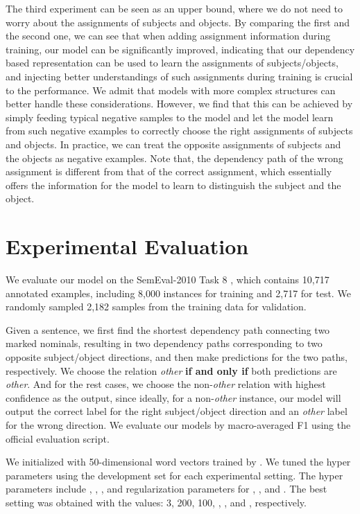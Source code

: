 \documentclass[11pt,a4paper]{article}
\begin{document}
The third experiment can be seen as an upper bound, where we do not need to worry about the assignments 
of subjects and objects. By comparing the first and the second one, we can see that when adding 
assignment information during training, our model can be significantly improved, indicating that our dependency based representation can be used to  learn the assignments of subjects/objects, and injecting
 better understandings of such assignments during training is crucial to the performance. 
We admit that models with more complex structures can better handle these considerations. 
However, we find that this can be achieved by simply feeding typical negative samples to the model 
and let the model learn from such negative examples to correctly choose the right assignments of subjects and objects. 
In practice, we can treat the opposite assignments of subjects and the objects as negative examples. 
Note that, the dependency path of the wrong assignment is different from that of the correct assignment, which essentially offers the information for the model to learn to distinguish the subject and the object. 







\section{Experimental Evaluation}
We evaluate our model on the SemEval-2010 Task 8 \cite{hendrickx}, which contains 10,717 annotated examples, including 8,000 instances for training and 2,717 for test. We randomly sampled 2,182 samples from the training data for validation.

Given a sentence, we first find the shortest dependency path connecting two marked nominals, resulting in two dependency paths corresponding to two opposite subject/object directions, and then make predictions for the two paths, respectively. 
We choose the relation \textit{other} \textbf{if and only if} both predictions are \textit{other}. And for the rest cases, 
we choose the non-\textit{other} relation with highest confidence as the output, since ideally, for a non-\textit{other} instance, 
our model will output the correct label for the right  subject/object direction and an   \textit{other}  label for the wrong direction.
We evaluate our models by macro-averaged F1 using the official evaluation script.



We initialized  with 50-dimensional word vectors trained by .
We tuned the hyper parameters using the development set for each experimental setting. The hyper parameters include , , , and regularization parameters for , ,  and . The best setting was obtained with the values: 3, 200, 100, , ,  and , respectively.
\end{document}
